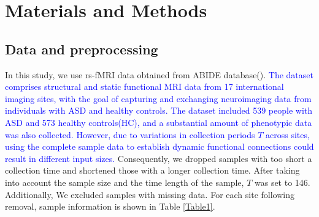 \documentclass[a4paper]{cas-dc}
\begin{document}








\section{Materials and Methods}\label{Materials and Methods}
\subsection{Data and preprocessing}
In this study, we use rs-fMRI data obtained from ABIDE database(\cite{craddock2013neuro}).\textcolor{blue}{ The dataset comprises structural and static functional MRI data from 17 international imaging sites, with the goal of capturing and exchanging neuroimaging data from individuals with ASD and healthy controls. The dataset included 539 people with ASD and 573 healthy controls(HC), and a substantial amount of phenotypic data was also collected. However, due to variations in collection periods $T$ across sites, using the complete sample data to establish dynamic functional connections could result in different input sizes.} Consequently, we dropped samples with too short a collection time and shortened those with a longer collection time. After taking into account the sample size and the time length of the sample, $T$ was set to 146. Additionally, We excluded samples with missing data. For each site following removal, sample information is shown in Table \ref{Table1}.
\end{document}

